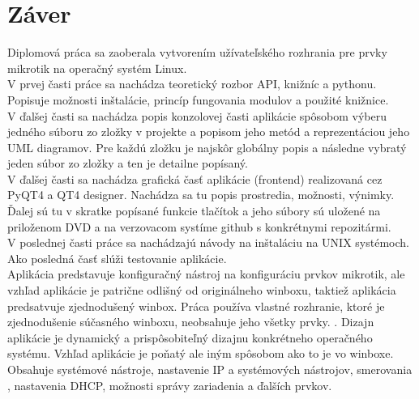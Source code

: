 \chapter{Záver}
Diplomová práca sa zaoberala vytvorením užívateľského rozhrania pre prvky mikrotik na operačný systém Linux. \\
V prvej časti práce sa nachádza teoretický rozbor API, knižníc a pythonu. Popisuje možnosti inštalácie, princíp fungovania modulov a použité knižnice.\\
V ďalšej časti sa nachádza popis konzolovej časti aplikácie spôsobom výberu jedného súboru zo zložky v projekte a popisom jeho metód  a reprezentáciou jeho UML diagramov. Pre každú zložku je najskôr globálny popis a následne vybratý jeden súbor zo zložky a ten je detailne popísaný.\\
V ďalšej časti  sa nachádza grafická časť aplikácie (frontend) realizovaná cez PyQT4 a QT4 designer. Nachádza sa tu popis prostredia, možnosti, výnimky. Ďalej sú tu v skratke popísané funkcie tlačítok a jeho súbory sú uložené na priloženom DVD a na verzovacom systíme github s konkrétnymi repozitármi.\\
V poslednej časti  práce sa nachádzajú návody na inštaláciu na UNIX systémoch. Ako posledná časť slúži testovanie aplikácie. \\
Aplikácia predstavuje konfiguračný nástroj na konfiguráciu prvkov mikrotik, ale vzhľad aplikácie je patrične odlišný od originálneho winboxu, taktiež aplikácia predsatvuje zjednodušený winbox. Práca používa vlastné rozhranie, ktoré je zjednodušenie súčasného winboxu, neobsahuje jeho všetky prvky. . Dizajn aplikácie je dynamický a prispôsobiteľný dizajnu konkrétneho operačného systému. Vzhľad aplikácie je poňatý ale iným spôsobom ako to je vo winboxe. Obsahuje systémové nástroje, nastavenie IP a systémových nástrojov, smerovania , nastavenia DHCP, možnosti správy zariadenia a ďalších prvkov.   